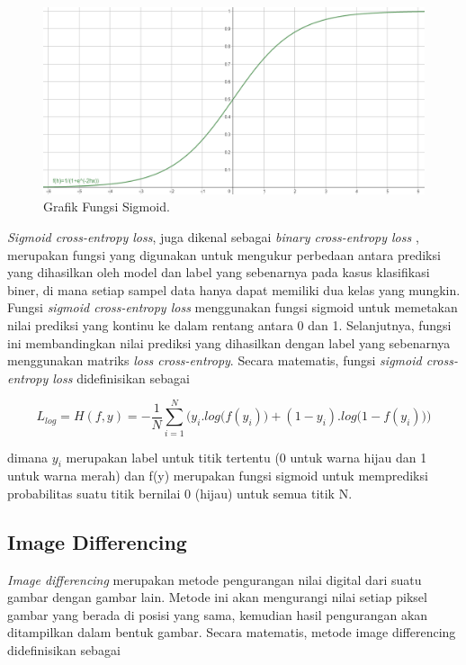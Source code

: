 \begin{figure}[ht]
  \centering
  \includegraphics[scale=0.35]{gambar/sigmoid.png}
  \caption{Grafik Fungsi Sigmoid.}
  \label{fig:sigmoid}
\end{figure}

\emph{Sigmoid cross-entropy loss}, juga dikenal sebagai \emph{binary cross-entropy loss} \parencite{lossFunction}, merupakan fungsi yang digunakan untuk mengukur perbedaan antara prediksi yang dihasilkan oleh model dan label yang sebenarnya pada kasus klasifikasi biner, di mana setiap sampel data hanya dapat memiliki dua kelas yang mungkin. 
Fungsi \emph{sigmoid cross-entropy loss} menggunakan fungsi sigmoid untuk memetakan nilai prediksi yang kontinu ke dalam rentang antara 0 dan 1. 
Selanjutnya, fungsi ini membandingkan nilai prediksi yang dihasilkan dengan label yang sebenarnya menggunakan matriks \emph{loss cross-entropy}. 
Secara matematis, fungsi \emph{sigmoid cross-entropy loss} didefinisikan sebagai 

\begin{equation}
  \label{eq:sigmoidCrossEntropyLoss}
  L_{log} = H(f,y) = - \frac{1}{N}  \sum_ {i=1} ^N  \big( y_{i} . log \big(f( y_{i} ) \big) +(1 - y_{i}) . log \big(1 - f( y_{i} ) \big) \big)  
\end{equation}

dimana $y_{i}$ merupakan label untuk titik tertentu (0 untuk warna hijau dan 1 untuk warna merah) dan f(y) merupakan fungsi sigmoid untuk memprediksi probabilitas suatu titik bernilai 0 (hijau) untuk semua titik N.

\subsection{Image Differencing}
\label{imagediff}

\emph{Image differencing} merupakan metode pengurangan nilai digital dari suatu gambar dengan gambar lain. 
Metode ini akan mengurangi nilai setiap piksel gambar yang berada di posisi yang sama, kemudian hasil pengurangan akan ditampilkan dalam bentuk gambar. 
Secara matematis, metode image differencing didefinisikan sebagai

